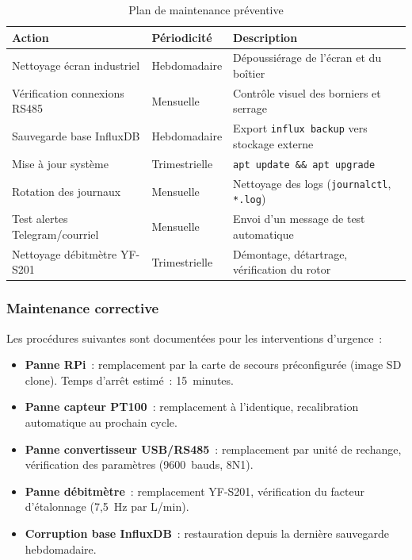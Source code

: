 \begin{table}[htbp]
\centering
\renewcommand{\arraystretch}{1.45}
\caption{Plan de maintenance préventive}
\label{tab:maintenance_prev}
\begin{tabular}{|p{}|p{}|p{}|}
\hline
\rowcolor{gray!25}
\textbf{Action} & \textbf{Périodicité} & \textbf{Description} \\
\hline
Nettoyage écran industriel & Hebdomadaire & Dépoussiérage de l'écran et du boîtier \\
\hline
Vérification connexions RS485 & Mensuelle & Contrôle visuel des borniers et serrage \\
\hline
Sauvegarde base InfluxDB & Hebdomadaire & Export \texttt{influx backup} vers stockage externe \\
\hline
Mise à jour système & Trimestrielle & \texttt{apt update \&\& apt upgrade} \\
\hline
Rotation des journaux & Mensuelle & Nettoyage des logs (\texttt{journalctl}, \texttt{*.log}) \\
\hline
Test alertes Telegram/courriel & Mensuelle & Envoi d'un message de test automatique \\
\hline
Nettoyage débitmètre YF-S201 & Trimestrielle & Démontage, détartrage, vérification du rotor \\
\hline
\end{tabular}
\end{table}

\subsubsection{Maintenance corrective}

Les procédures suivantes sont documentées pour les interventions d'urgence~:

\begin{itemize}
  \item \textbf{Panne RPi}~: remplacement par la carte de secours préconfigurée (image SD clone). Temps d'arrêt estimé~: 15~minutes.
  \item \textbf{Panne capteur PT100}~: remplacement à l'identique, recalibration automatique au prochain cycle.
  \item \textbf{Panne convertisseur USB/RS485}~: remplacement par unité de rechange, vérification des paramètres (9600~bauds, 8N1).
  \item \textbf{Panne débitmètre}~: remplacement YF-S201, vérification du facteur d'étalonnage (7,5~Hz par L/min).
  \item \textbf{Corruption base InfluxDB}~: restauration depuis la dernière sauvegarde hebdomadaire.
\end{itemize}

